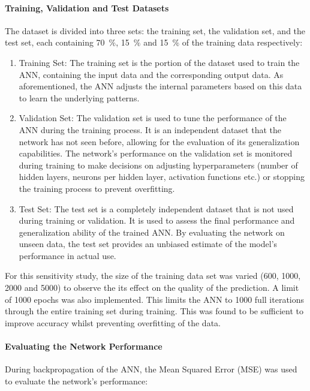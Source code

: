 \paragraph{Training, Validation and Test Datasets}

The dataset is divided into three sets: the training set, the validation set, and the test set, each containing 70~$\%$, 15~$\%$ and 15~$\%$ of the training data respectively:

\begin{enumerate}
	\item Training Set: The training set is the portion of the dataset used to train the ANN, containing the input data and the corresponding output data. As aforementioned, the ANN adjusts the internal parameters based on this data to learn the underlying patterns.
	\item Validation Set: The validation set is used to tune the performance of the ANN during the training process. It is an independent dataset that the network has not seen before, allowing for the evaluation of its generalization capabilities. The network's performance on the validation set is monitored during training to make decisions on adjusting hyperparameters (number of hidden layers, neurons per hidden layer, activation functions etc.) or stopping the training process to prevent overfitting.
	\item Test Set: The test set is a completely independent dataset that is not used during training or validation. It is used to assess the final performance and generalization ability of the trained ANN. By evaluating the network on unseen data, the test set provides an unbiased estimate of the model's performance in actual use.
\end{enumerate}

For this sensitivity study, the size of the training data set was varied (600, 1000, 2000 and 5000) to observe the its effect on the quality of the prediction. A limit of 1000 epochs was also implemented. This limits the ANN to 1000 full iterations through the entire training set during training. This was found to be sufficient to improve accuracy whilst preventing overfitting of the data.

\paragraph{Evaluating the Network Performance}

During backpropagation of the ANN, the Mean Squared Error (MSE) was used to evaluate the network's performance:


